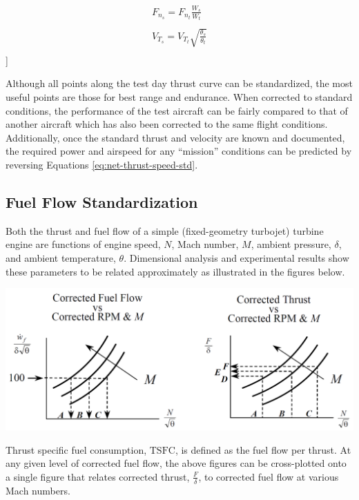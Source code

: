 \documentclass[
]{book}
\begin{document}
\begin{align}
F_{n_s} = F_{n_t} \frac{W_s}{W_t}\\
\\
V_{T_s} = V_{T_t} \sqrt{\frac{\theta_s}{\theta_t}}\\
\end{align}
\label{eq:net-thrust-speed-std}
{]}

Although all points along the test day thrust curve can be standardized, the
most useful points are those for best range and endurance. When corrected to
standard conditions, the performance of the test aircraft can be fairly compared
to that of another aircraft which has also been corrected to the same flight
conditions. Additionally, once the standard thrust and velocity are known and
documented, the required power and airspeed for any ``mission'' conditions can be
predicted by reversing Equations \eqref{eq:net-thrust-speed-std}.

\hypertarget{fuel-flow-standardization-1}{%
\subsection{Fuel Flow Standardization}\label{fuel-flow-standardization-1}}

Both the thrust and fuel flow of a simple (fixed-geometry turbojet) turbine
engine are functions of engine speed, \(N\), Mach number, \(M\), ambient
pressure, \(\delta\), and ambient temperature, \(\theta\). Dimensional analysis
and experimental results show these parameters to be related approximately as
illustrated in the figures below.

\includegraphics[width=8in,height=\textheight]{media/12/corr-fuel-flow-thrust-rpm-m.png}

Thrust specific fuel consumption, \(\mathrm{TSFC}\), is defined as the fuel flow
per thrust. At any given level of corrected fuel flow, the above figures can be
cross-plotted onto a single figure that relates corrected thrust,
\(\frac{F}{\delta}\), to corrected fuel flow at various Mach numbers.
\end{document}
